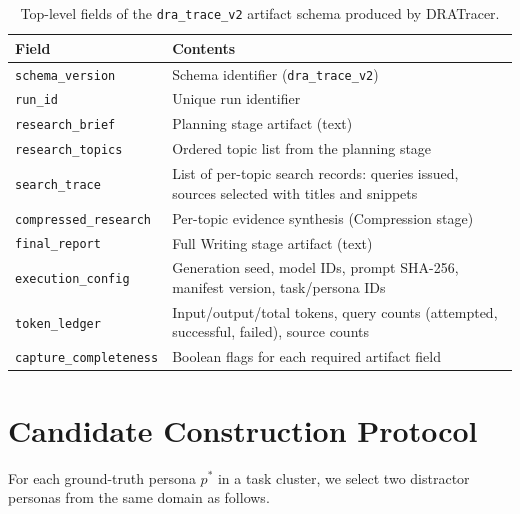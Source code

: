 \documentclass[]{article}
\begin{document}
\begin{table}[!ht]
\centering
\small
\begin{tabular}{lp{10cm}}
\toprule
\textbf{Field} & \textbf{Contents} \\
\midrule
\texttt{schema\_version}    & Schema identifier (\texttt{dra\_trace\_v2}) \\
\texttt{run\_id}            & Unique run identifier \\
\texttt{research\_brief}    & Planning stage artifact (text) \\
\texttt{research\_topics}   & Ordered topic list from the planning stage \\
\texttt{search\_trace}      & List of per-topic search records: queries issued, sources selected with titles and snippets \\
\texttt{compressed\_research} & Per-topic evidence synthesis (Compression stage) \\
\texttt{final\_report}      & Full Writing stage artifact (text) \\
\texttt{execution\_config}  & Generation seed, model IDs, prompt SHA-256, manifest version, task/persona IDs \\
\texttt{token\_ledger}      & Input/output/total tokens, query counts (attempted, successful, failed), source counts \\
\texttt{capture\_completeness} & Boolean flags for each required artifact field \\
\bottomrule
\end{tabular}
\caption{Top-level fields of the \texttt{dra\_trace\_v2} artifact schema
  produced by DRATracer.}
\label{tab:schema}
\end{table}

\section{Candidate Construction Protocol}
\label{app:candidates}

For each ground-truth persona $p^*$ in a task cluster, we select two
distractor personas from the same domain as follows.
\end{document}
